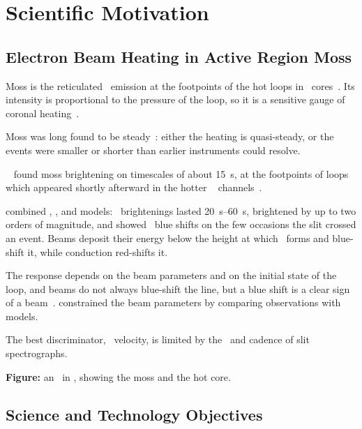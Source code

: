 \section{Scientific Motivation}%
\label{sec:ScientificMotivation}%
\subsection{Electron Beam Heating in Active Region Moss}%
\label{subsec:ElectronBeamHeatinginActiveRegionMoss}%

\begin{outline}
\item Moss is the reticulated \TR\ emission at the footpoints of the hot loops in \AR\
    cores~\citep{Berger1999}.
    Its intensity is proportional to the pressure of the loop, so it is a sensitive gauge of
    coronal heating~\citep{Martens2000}.
\item Moss was long found to be steady~\citep{Antiochos2003,Brooks2009}: either the heating is
    quasi-steady, or the events were smaller or shorter than earlier instruments could resolve.
\item \HiCCapital~\citep{Kobayashi2014} found moss brightening on timescales of about
    \SI{15}{\second}, at the footpoints of loops which appeared shortly afterward in the hotter
    \AIA~\citep{Lemen2012} channels~\citep{Testa2013}.
\item \citet{Testa2014} combined \IRIS, \AIA, and models: \TR\ brightenings lasted
    \SIrange{20}{60}{\second}, brightened by up to two orders of magnitude, and showed \SiIV\ blue
    shifts on the few occasions the slit crossed an event.
    Beams deposit their energy below the height at which \SiIV\ forms and blue-shift it, while
    conduction red-shifts it.
\item The response depends on the beam parameters and on the initial state of the loop, and beams
    do not always blue-shift the line, but a blue shift is a clear sign of a beam~\citep{Polito2018}.
    \citet{Testa2023} constrained the beam parameters by comparing observations with models.
\item The best discriminator, \TR\ velocity, is limited by the \FOV\ and cadence of slit
    spectrographs.
\item \textbf{Figure:} an \AR\ in \AIA, showing the moss and the hot core.
\end{outline}

%
\subsection{Science and Technology Objectives}%
\label{subsec:ScienceandTechnologyObjectives}%

